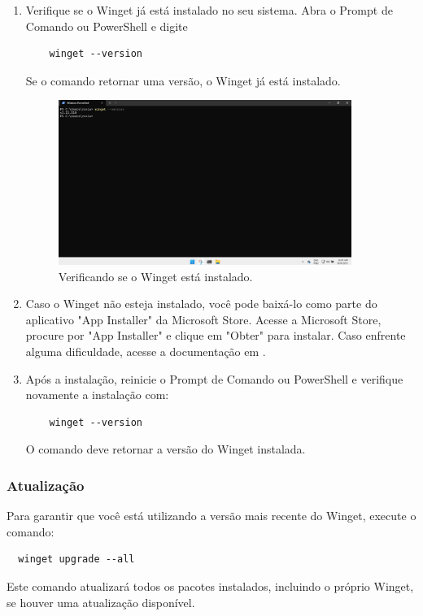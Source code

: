 \begin{enumerate}
  \item Verifique se o Winget já está instalado no seu sistema. Abra o Prompt de Comando ou PowerShell e digite
  \begin{verbatim}
    winget --version
  \end{verbatim}
  Se o comando retornar uma versão, o Winget já está instalado.
  \begin{figure}[H]
    \centering
    \includegraphics[width=0.9\textwidth]{./assets/images/07_winget_installed.png}
    \caption{Verificando se o Winget está instalado.}
    \label{fig:winget_installed}
  \end{figure}
  \item Caso o Winget não esteja instalado, você pode baixá-lo como parte do aplicativo "App Installer" da Microsoft Store. Acesse a Microsoft Store, procure por "App Installer" e clique em "Obter" para instalar. Caso enfrente alguma dificuldade, acesse a documentação em \cite{microsoft_winget}.
  \item Após a instalação, reinicie o Prompt de Comando ou PowerShell e verifique novamente a instalação com:
  \begin{verbatim}
    winget --version
  \end{verbatim}
  O comando deve retornar a versão do Winget instalada.
\end{enumerate}
\par
\subsubsection{Atualização}
Para garantir que você está utilizando a versão mais recente do Winget, execute o comando:
\begin{verbatim}
  winget upgrade --all
\end{verbatim}
Este comando atualizará todos os pacotes instalados, incluindo o próprio Winget, se houver uma atualização disponível.